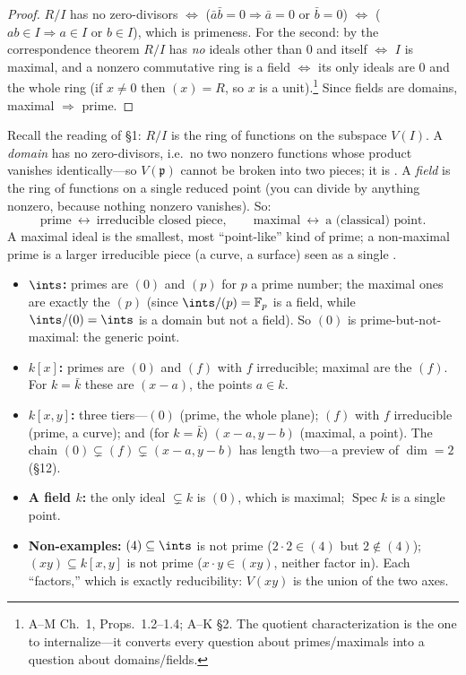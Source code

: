 \documentclass[11pt]{article}
\DeclareMathOperator{\Spec}{Spec}
\newcommand{\mfp}{\mathfrak{p}}
\begin{document}
\begin{proof}
$R/I$ has no zero-divisors $\iff$ ($\bar a\bar b=0\Rightarrow\bar a=0$ or $\bar b=0$) $\iff$
($ab\in I\Rightarrow a\in I$ or $b\in I$), which is primeness. For the second: by the
correspondence theorem $R/I$ has \emph{no} ideals other than $0$ and itself $\iff$ $I$ is
maximal, and a nonzero commutative ring is a field $\iff$ its only ideals are $0$ and the
whole ring (if $x\neq 0$ then $(x)=R$, so $x$ is a unit).\footnote{A--M Ch.~1, Props.\ 1.2--1.4; A--K \S2. The quotient characterization is
the one to internalize---it converts every question about primes/maximals into a question
about domains/fields.} Since fields are domains, maximal $\Rightarrow$ prime.
\end{proof}

\begin{iintuition}[Domain $=$ irreducible, field $=$ point]
Recall the reading of \S1: $R/I$ is the ring of functions on the subspace $V(I)$. A
\emph{domain} has no zero-divisors, i.e.\ no two nonzero functions whose product vanishes
identically---so $V(\mfp)$ cannot be broken into two pieces; it is . A
\emph{field} is the ring of functions on a single reduced point (you can divide by anything
nonzero, because nothing nonzero vanishes). So:
\[
\text{prime} \ \longleftrightarrow\ \text{irreducible closed piece},\qquad
\text{maximal} \ \longleftrightarrow\ \text{a (classical) point}.
\]
A maximal ideal is the smallest, most ``point-like'' kind of prime; a non-maximal prime is a
larger irreducible piece (a curve, a surface) seen as a single .
\end{iintuition}

\begin{eexample}
\begin{itemize}\setlength{\itemsep}{3pt}
\item \textbf{$\ints$:} primes are $(0)$ and $(p)$ for $p$ a prime number; the maximal ones
are exactly the $(p)$ (since $\ints/(p)=\mathbb{F}_p$ is a field, while $\ints/(0)=\ints$ is a
domain but not a field). So $(0)$ is prime-but-not-maximal: the generic point.
\item \textbf{$k[x]$:} primes are $(0)$ and $(f)$ with $f$ irreducible; maximal are the
$(f)$. For $k=\bar k$ these are $(x-a)$, the points $a\in k$.
\item \textbf{$k[x,y]$:} three tiers---$(0)$ (prime, the whole plane); $(f)$ with $f$
irreducible (prime, a curve); and (for $k=\bar k$) $(x-a,y-b)$ (maximal, a point). The chain
$(0)\subsetneq (f)\subsetneq (x-a,y-b)$ has length two---a preview of $\dim=2$ (\S12).
\item \textbf{A field $k$:} the only ideal $\subsetneq k$ is $(0)$, which is maximal; $\Spec k$
is a single point.
\item \textbf{Non-examples:} $(4)\subseteq\ints$ is not prime ($2\cdot2\in(4)$ but
$2\notin(4)$); $(xy)\subseteq k[x,y]$ is not prime ($x\cdot y\in (xy)$, neither factor in).
Each ``factors,'' which is exactly reducibility: $V(xy)$ is the union of the two axes.
\end{itemize}
\end{eexample}
\end{document}
